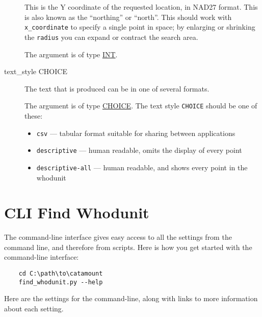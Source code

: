 \begin{description}
This is the Y coordinate of the requested location, in NAD27 format.
This is also known as the ``northing'' or ``north''. This should work
with \verb=x_coordinate= to specify a single point in space; by
enlarging or shrinking the \verb=radius= you can expand or contract
the search area.

The argument is of type \hyperlink{argument-type-int}{INT}.

\item[text\_style CHOICE]
\hypertarget{whodunit-text-style}{}

The text that is produced can be in one of several formats.

The argument is of type \hyperlink{argument-type-choice}{CHOICE}. The text
style \verb=CHOICE= should be one of these:

\begin{itemize}
\item \verb=csv= --- tabular format suitable for sharing between applications
\item \verb=descriptive= --- human readable, omits the display of every point
\item \verb=descriptive-all= --- human readable, and shows every point in the whodunit
\end{itemize}

\end{description}


\section{CLI Find Whodunit}

The command-line interface gives easy access to all the settings from the
command line, and therefore from scripts. Here is how you get started with
the command-line interface:

\begin{verbatim}
    cd C:\path\to\catamount
    find_whodunit.py --help
\end{verbatim}

Here are the settings for the command-line, along with links to
more information about each setting.

